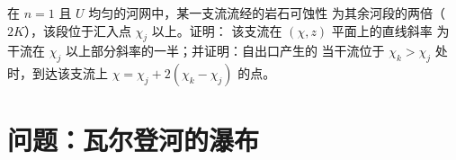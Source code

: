 \begin{exercise}[$\star\star\star$]\label{exo:b3:quantitative-geomorphology:12}
在 $n = 1$ 且 $U$ 均匀的河网中，某一支流流经的岩石可蚀性
为其余河段的两倍（$2K$），该段位于汇入点 $\chi_j$ 以上。证明：
该支流在 $(\chi, z)$ 平面上的直线斜率
为干流在 $\chi_j$ 以上部分斜率的一半；并证明：自出口产生的
当干流位于 $\chi_k > \chi_j$ 处时，到达该支流上
$\chi = \chi_j + 2(\chi_k - \chi_j)$ 的点。
\end{exercise}

\section{问题：瓦尔登河的瀑布}

